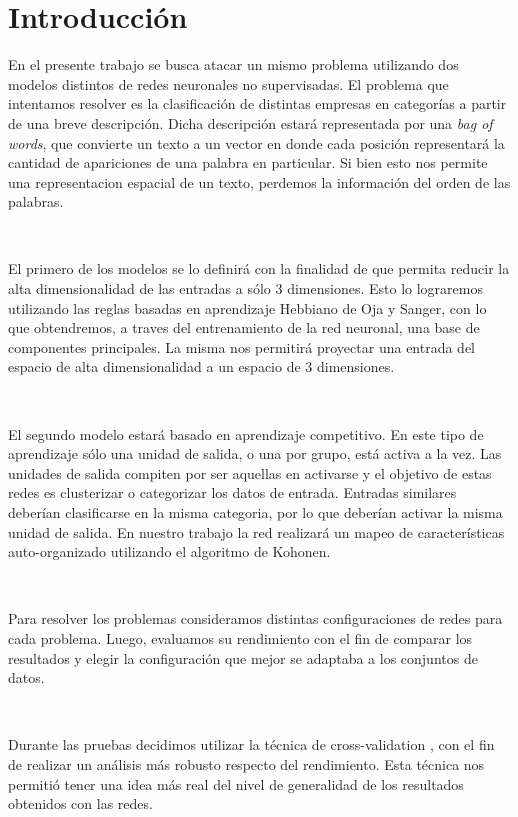 \documentclass[informe.tex]{subfiles}
\begin{document}
  
  \section{Introducción}
  
  En el presente trabajo se busca atacar un mismo problema utilizando dos modelos distintos de redes neuronales no supervisadas. El problema que intentamos resolver es la clasificación de distintas empresas en categorías a partir de una breve descripción. Dicha descripción estará representada por una {\it bag of words}, que convierte un texto a un vector en donde cada posición representará la cantidad de apariciones de una palabra en particular. Si bien esto nos permite una representacion espacial de un texto, perdemos la información del orden de las palabras.
  
  ~

  El primero de los modelos se lo definirá con la finalidad de que permita reducir la alta dimensionalidad de las entradas a sólo 3 dimensiones. Esto lo lograremos utilizando las reglas basadas en aprendizaje Hebbiano de Oja y Sanger\cite{haykin}, con lo que obtendremos, a traves del entrenamiento de la red neuronal, una base de componentes principales. La misma nos permitirá proyectar una entrada del espacio de alta dimensionalidad a un espacio de 3 dimensiones.
  
  ~
  
  El segundo modelo estará basado en aprendizaje competitivo\cite{haykin}. En este tipo de aprendizaje sólo una unidad de salida, o una por grupo, está activa a la vez. Las unidades de salida compiten por ser aquellas en activarse y el objetivo de estas redes es clusterizar o categorizar los datos de entrada. Entradas similares deberían clasificarse en la misma categoria, por lo que deberían activar la misma unidad de salida. En nuestro trabajo la red realizará un mapeo de características auto-organizado utilizando el algoritmo de Kohonen.
  
  ~
  
  Para resolver los problemas consideramos distintas configuraciones de redes para cada problema. Luego, evaluamos su rendimiento con el fin de comparar los resultados y elegir la configuración que mejor se adaptaba a los conjuntos de datos.
  
  ~
  
  Durante las pruebas decidimos utilizar la técnica de cross-validation \cite{haykin}, con el fin de realizar un análisis más robusto respecto del rendimiento. Esta técnica nos permitió tener una idea más real del nivel de generalidad de los resultados obtenidos con las redes.
  
  
\end{document}
